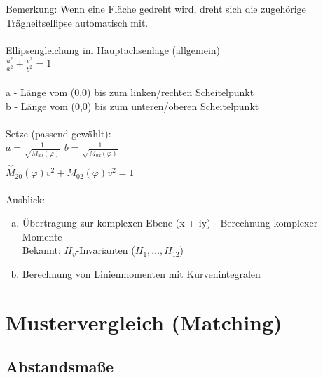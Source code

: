 \documentclass[a4paper,12pt]{scrreprt}
\begin{document}
  Bemerkung: Wenn eine Fläche gedreht wird, dreht sich die zugehörige Trägheitsellipse automatisch mit.\\
  \\
  Ellipsengleichung im Hauptachsenlage (allgemein)
  \\
  $\frac{u^2}{a^2} + \frac{v^2}{b^2} = 1 $\\
  \\
  a - Länge vom (0,0) bis zum linken/rechten Scheitelpunkt\\
  b - Länge vom (0,0) bis zum unteren/oberen Scheitelpunkt\\
  \\
  Setze (passend gewählt):\\
  $a = \frac{1}{\sqrt{M_{20}(\varphi)}}$
  $b = \frac{1}{\sqrt{M_{02}(\varphi)}}$\\
  $\downarrow$\\
  $M_{20}(\varphi) v^2 + M_{02} (\varphi) v^2 = 1$\\
  \\
  Ausblick:
  \begin{enumerate}[(a)]
   \item Übertragung zur komplexen Ebene (x + iy) - Berechnung komplexer Momente\\
	  Bekannt: $H_v$-Invarianten ($H_1,\dots,H_{12}$)
   \item Berechnung von Linienmomenten mit Kurvenintegralen
  \end{enumerate}

  \chapter{Mustervergleich (Matching) }
  
  \section{Abstandsmaße}
  
\end{document}
